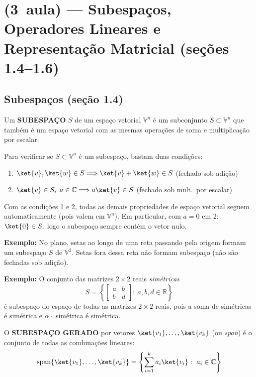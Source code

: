\section*{(3\textordfeminine\ aula) --- Subespaços, Operadores Lineares e Representação Matricial (seções 1.4--1.6)}

\subsection*{Subespaços (seção 1.4)}

\begin{shadequote}
    Um \textbf{SUBESPAÇO} $S$ de um espaço vetorial $\mathbb{V}^n$ é um subconjunto $S \subset \mathbb{V}^n$ que também é um espaço vetorial com as mesmas operações de soma e multiplicação por escalar.
\end{shadequote}

Para verificar se $S \subset \mathbb{V}^n$ é um subespaço, bastam duas condições:
\begin{enumerate}
    \item $\ket{v}, \ket{w} \in S \Longrightarrow \ket{v} + \ket{w} \in S$ \quad (fechado sob adição)
    \item $\ket{v} \in S,\ a \in \mathbb{C} \Longrightarrow a\ket{v} \in S$ \quad (fechado sob mult.\ por escalar)
\end{enumerate}

\begin{observacao}[]{}
    Com as condições 1 e 2, todas as demais propriedades de espaço vetorial seguem automaticamente (pois valem em $\mathbb{V}^n$). Em particular, com $a=0$ em 2: $\ket{0} \in S$, logo o subespaço sempre contém o vetor nulo.
\end{observacao}

\textbf{Exemplo:} No plano, setas ao longo de uma reta passando pela origem formam um subespaço $S$ de $\mathbb{V}^2$. Setas fora dessa reta não formam subespaço (não são fechadas sob adição).

\textbf{Exemplo:} O conjunto das matrizes $2\times2$ reais \emph{simétricas}
\[
    S = \left\{ \begin{bmatrix} a & b \\ b & d \end{bmatrix} :\ a, b, d \in \mathbb{R} \right\}
\]
é subespaço do espaço de todas as matrizes $2\times2$ reais, pois a soma de simétricas é simétrica e $\alpha \cdot$ simétrica é simétrica.

\begin{shadequote}
    O \textbf{SUBESPAÇO GERADO} por vetores $\ket{v_1}, \dots, \ket{v_k}$ (ou \emph{span}) é o conjunto de todas as combinações lineares:
    \[
        \mathrm{span}\{\ket{v_1}, \dots, \ket{v_k}\} = \left\{ \sum_{i=1}^k a_i \ket{v_i} :\ a_i \in \mathbb{C} \right\}
    \]
\end{shadequote}

